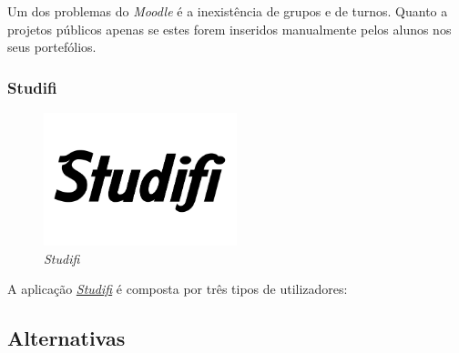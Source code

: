 Um dos problemas do \emph{Moodle} é a inexistência de grupos e de turnos. Quanto a projetos públicos apenas se estes forem inseridos manualmente pelos alunos nos seus portefólios.

\subsubsection{Studifi} %
\label{ssub:studifi}

\begin{figure}[H]
        \centering
        \includegraphics[width=0.5\textwidth]{images/concorrencia/studifi.png}
         \caption{\emph{Studifi}}
         \label{fig: studifi}
\end{figure}

A aplicação \href{https://studifi.com/}{\emph{Studifi}} é composta por três tipos de utilizadores:

\begin{description}
	\item[]
\end{description}


\subsection{Alternativas} %
\label{sub:alternativas}

